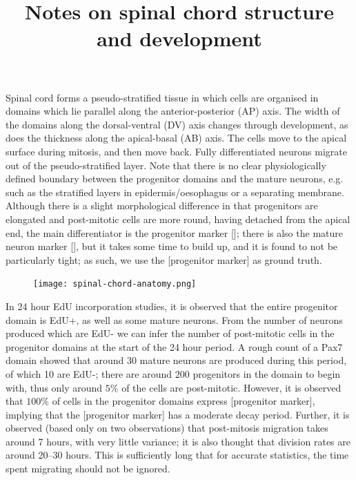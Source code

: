 \documentclass[10pt,english]{article}
\begin{document}
\title{Notes on spinal chord structure and development}

\maketitle

Spinal cord forms a pseudo-stratified tissue in which cells are organised in domains which lie parallel along the anterior-posterior (AP) axis. The width of the domains along the dorsal-ventral (DV) axis changes through development, as does the thickness along the apical-basal (AB) axis. The cells move to the apical surface during mitosis, and then move back. Fully differentiated neurons migrate out of the pseudo-stratified layer. Note that there is no clear physiologically defined boundary between the progenitor domains and the mature neurons, e.g. such as the stratified layers in epidermis/oesophagus or a separating membrane. Although there is a slight morphological difference in that progenitors are elongated and post-mitotic cells are more round, having detached from the apical end, the main differentiator is the progenitor marker []; there is also the mature neuron marker [], but it takes some time to build up, and it is found to not be particularly tight; as such, we use the [progenitor marker] as ground truth.

\begin{figure}[h]
	\begin{center}
		\texttt{[image: spinal-chord-anatomy.png]}
	\end{center}
\end{figure}

In 24 hour EdU incorporation studies, it is observed that the entire progenitor domain is EdU+, as well as some mature neurons. From the number of neurons produced which are EdU- we can infer the number of post-mitotic cells in the progenitor domains at the start of the 24 hour period. A rough count of a Pax7 domain showed that around 30 mature neurons are produced during this period, of which 10 are EdU-; there are around 200 progenitors in the domain to begin with, thus only around $5\%$ of the cells are post-mitotic. However, it is observed that $100\%$ of cells in the progenitor domains express [progenitor marker], implying that the [progenitor marker] has a moderate decay period. Further, it is observed (based only on two observations) that post-mitosis migration takes around 7 hours, with very little variance; it is also thought that division rates are around 20--30 hours. This is sufficiently long that for accurate statistics, the time spent migrating should not be ignored.
\end{document}
